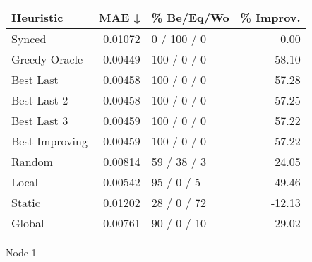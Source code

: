 \begin{tabular}{lrlr}
\toprule
\textbf{Heuristic} & \textbf{MAE ↓} & \textbf{\% Be/Eq/Wo} & \textbf{\% Improv.} \\
\midrule
            Synced &        0.01072 &          0 / 100 / 0 &                0.00 \\
     Greedy Oracle &        0.00449 &          100 / 0 / 0 &               58.10 \\
         Best Last &        0.00458 &          100 / 0 / 0 &               57.28 \\
       Best Last 2 &        0.00458 &          100 / 0 / 0 &               57.25 \\
       Best Last 3 &        0.00459 &          100 / 0 / 0 &               57.22 \\
    Best Improving &        0.00459 &          100 / 0 / 0 &               57.22 \\
            Random &        0.00814 &          59 / 38 / 3 &               24.05 \\
             Local &        0.00542 &           95 / 0 / 5 &               49.46 \\
            Static &        0.01202 &          28 / 0 / 72 &              -12.13 \\
            Global &        0.00761 &          90 / 0 / 10 &               29.02 \\
\bottomrule
\end{tabular}
\caption{Node 1}
\label{tab:non_lr01_le2_bs4_1}
